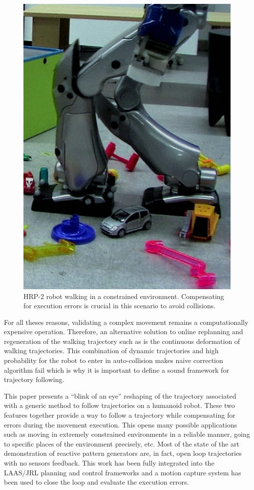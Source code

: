 \begin{figure}[ht!]
  \begin{center}
    \includegraphics[width=.4\textwidth]{fig/exp2.jpg}
  \end{center}
  \caption{HRP-2 robot walking in a constrained
    environment. Compensating for execution errors is crucial in this
    scenario to avoid collisions. \label{fig:following}}
\end{figure}



For all theses reasons, validating a complex movement remains a
computationally expensive operation. Therefore, an alternative
solution to online replanning and regeneration of the walking
trajectory such as \cite{11icra.dimitrov, 10ar.herdt,
  06icra.nishiwaki, 05humanoids.michel} is the continuous deformation
of walking trajectories.  This combination of dynamic trajectories and
high probability for the robot to enter in auto-collision makes naive
correction algorithm fail which is why it is important to define a
sound framework for trajectory following.


This paper presents a ``blink of an eye'' reshaping of the trajectory
associated with a generic method to follow trajectories on a humanoid
robot. These two features together provide a way to follow a
trajectory while compensating for errors during the movement
execution. This opens many possible applications such as moving in
extremely constrained environments in a reliable manner, going to
specific places of the environment precisely, etc. Most of the state
of the art demonstration of reactive pattern generators are, in fact,
open loop trajectories with no sensors feedback. This work has been
fully integrated into the LAAS/JRL planning and control frameworks and
a motion capture system has been used to close the loop and evaluate
the execution errors.

